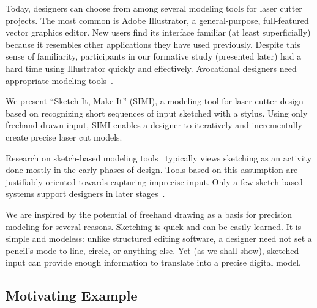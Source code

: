 \documentclass{article}
\begin{document}
Today, designers can choose from among several modeling tools for
laser cutter projects. The most common is Adobe Illustrator, a
general-purpose, full-featured vector graphics editor. New users find
its interface familiar (at least superficially) because it resembles
other applications they have used previously. Despite this sense of
familiarity, participants in our formative study (presented later) had
a hard time using Illustrator quickly and effectively. Avocational
designers need appropriate modeling tools~\cite{lipson-homefactory}.

We present ``Sketch It, Make It'' (SIMI), a modeling tool for laser
cutter design based on recognizing short sequences of input sketched
with a stylus. Using only freehand drawn input, SIMI enables a
designer to iteratively and incrementally create precise laser cut
models.

Research on sketch-based modeling tools~\cite{johnson-sketch-review}
typically views sketching as an activity done mostly in the early
phases of design. Tools based on this assumption are justifiably
oriented towards capturing imprecise input. Only a few sketch-based
systems support designers in later
stages~\cite{mori-plushie,saul-sketch-chair,naya-parsketch}.



We are inspired by the potential of freehand drawing as a basis for
precision modeling for several reasons. Sketching is quick and can be
easily learned. It is simple and modeless: unlike structured editing
software, a designer need not set a pencil's mode to line, circle, or
anything else. Yet (as we shall show), sketched input can provide
enough information to translate into a precise digital model.

\subsection{Motivating Example}
\end{document}
